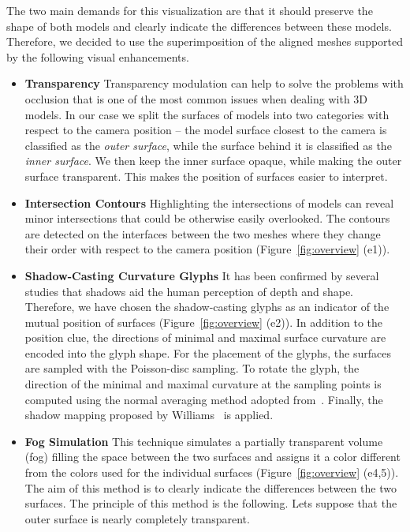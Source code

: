 \documentclass[final,5p,times]{elsarticle}
\begin{document}
The two main demands for this visualization are that it should preserve the shape of both models and clearly indicate the differences between these models.
Therefore, we decided to use the superimposition of the aligned meshes supported by the following visual enhancements.
\begin{itemize}
\item{\textbf{Transparency}} 
Transparency modulation can help to solve the problems with occlusion that is one of the most common issues when dealing with 3D models. 
In our case we split the surfaces of models into two categories with respect to the camera position -- the model surface closest to the camera is classified as the \textit{outer surface}, while the surface behind it is classified as the \textit{inner surface}.
We then keep the inner surface opaque, while making the outer surface transparent.
This makes the position of surfaces easier to interpret.
\item{\textbf{Intersection Contours}}
Highlighting the intersections of models can reveal minor intersections that could be otherwise easily overlooked. 
The contours are detected on the interfaces between the two meshes where they change their order with respect to the camera position (Figure~\ref{fig:overview} (e1)). 
\item{\textbf{Shadow-Casting Curvature Glyphs}}
It has been confirmed by several studies \cite{erens1993perception} that shadows aid the human perception of depth and shape.
Therefore, we have chosen the shadow-casting glyphs as an indicator of the mutual position of surfaces (Figure~\ref{fig:overview} (e2)). 
In addition to the position clue, the directions of minimal and maximal surface curvature are encoded into the glyph shape.
For the placement of the glyphs, the surfaces are sampled with the Poisson-disc sampling.
To rotate the glyph, the direction of the minimal and maximal curvature at the sampling points is computed using the normal averaging method adopted from~\cite{interrante1997conveying}.
Finally, the shadow mapping proposed by Williams~\cite{williams1978casting} is applied.
\item{\textbf{Fog Simulation}}
This technique simulates a partially transparent volume (fog) filling the space between the two surfaces and assigns it a color different from the colors used for the individual surfaces (Figure~\ref{fig:overview} (e4,5)). 
The aim of this method is to clearly indicate the differences between the two surfaces.
The principle of this method is the following.
Lets suppose that the outer surface is nearly completely transparent.

\end{itemize}
\end{document}
